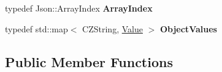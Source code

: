 \begin{DoxyCompactItemize}
\item 
typedef Json\+::\+Array\+Index {\bfseries Array\+Index}\hypertarget{class_json_1_1_value_a184a91566cccca7b819240f0d5561c7d}{}\label{class_json_1_1_value_a184a91566cccca7b819240f0d5561c7d}

\item 
typedef std\+::map$<$ C\+Z\+String, \hyperlink{class_json_1_1_value}{Value} $>$ {\bfseries Object\+Values}\hypertarget{class_json_1_1_value_a08b6c80c3af7071d908dabf044de5388}{}\label{class_json_1_1_value_a08b6c80c3af7071d908dabf044de5388}

\end{DoxyCompactItemize}
\subsection*{Public Member Functions}
